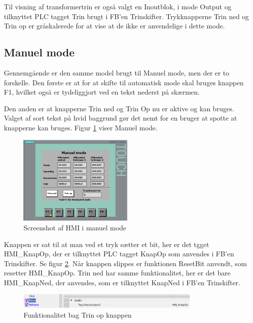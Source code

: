 Til visning af transformertrin er også valgt en Inoutblok, i mode Output og tilknyttet PLC tagget Trin brugt i FB'en Trinskifter. Trykknapperne Trin ned og Trin op er gråskalerede for at vise at de ikke er anvendelige i dette mode.

\subsection{Manuel mode}

Gennemgående er den samme model brugt til Manuel mode, men der er to forskelle. Den første er at for at skifte til automatisk mode skal bruges knappen F1, hvilket også er tydeliggjort ved en tekst nederst på skærmen.


Den anden er at knapperne Trin ned og Trin Op nu er aktive og kan bruges. Valget af sort tekst på hvid baggrund gør det nemt for en bruger at spotte at knapperne kan bruges. Figur \ref{fig:HMIManuelModeDesign} viser Manuel mode.

\begin{figure}[H] %
	\centering
	\includegraphics[width=0.5\textwidth]{Figure/HMIManuelModeDesign}
	\caption{Screenshot af HMI i manuel mode}
	\label{fig:HMIManuelModeDesign}
\end{figure}

Knappen er sat til at man ved et tryk sætter et bit, her er det tgget HMI\_KnapOp, der er tilknyttet PLC tagget KnapOp som anvendes i FB'en Trinskifter. Se figur \ref{fig:HMITrinOp}. Når knappen slippes er funktionen ResetBit anvendt, som resetter HMI\_KnapOp. Trin ned har samme funktionalitet, her er det bare HMI\_KnapNed, der anvendes, som er tilknyttet KnapNed i FB'en Trinskifter.

\begin{figure}[H] %
	\centering
	\includegraphics[width=0.8\textwidth]{Figure/HMITrinOp}
	\caption{Funktionalitet bag Trin op knappen}
	\label{fig:HMITrinOp}
\end{figure}

